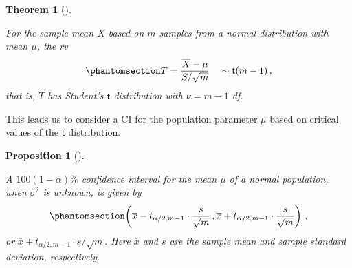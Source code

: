 \documentclass[
  a4paper,
  DIV=11,
  numbers=noendperiod,
  oneside]{scrreprt}
\theoremstyle{plain}
\newtheorem{theorem}{Theorem}[chapter]
\theoremstyle{definition}
\theoremstyle{definition}
\theoremstyle{definition}
\theoremstyle{plain}
\newtheorem{proposition}{Proposition}[chapter]
\theoremstyle{remark}
\begin{document}
\begin{theorem}[]\protect\hypertarget{thm-sample-mean-t-dist}{}\label{thm-sample-mean-t-dist}

For the sample mean \(\overline{X}\) based on \(m\) samples from a
normal distribution with mean \(\mu\), the rv
\begin{equation}\phantomsection\label{eq-t-statistic-mean}{
 T = \frac{\overline{X} - \mu}{S/\sqrt{m}}  \quad \sim \mathsf{t}(m-1)\,,
}\end{equation} that is, \(T\) has Student's \(\mathsf{t}\) distribution
with \(\nu = m-1\) df.

\end{theorem}

This leads us to consider a CI for the population parameter \(\mu\)
based on critical values of the \(\mathsf{t}\) distribution.

\begin{proposition}[]\protect\hypertarget{prp-ci-norm-unknown-var}{}\label{prp-ci-norm-unknown-var}

A \(100(1-\alpha)\%\) confidence interval for the mean \(\mu\) of a
normal population, when \(\sigma^2\) is unknown, is given by
\begin{equation}\phantomsection\label{eq-ci-norm-unknown-var}{
 \left(\overline{x} - t_{\alpha/2, m-1} \cdot \frac{s}{\sqrt{m}}\,, 
        \overline{x} + t_{\alpha/2, m-1} \cdot \frac{s}{\sqrt{m}} \right)\,, 
}\end{equation} or
\(\overline{x} \pm t_{\alpha/2, m-1} \cdot s/ \sqrt{m}.\) Here
\(\overline{x}\) and \(s\) are the sample mean and sample standard
deviation, respectively.

\end{proposition}
\end{document}
